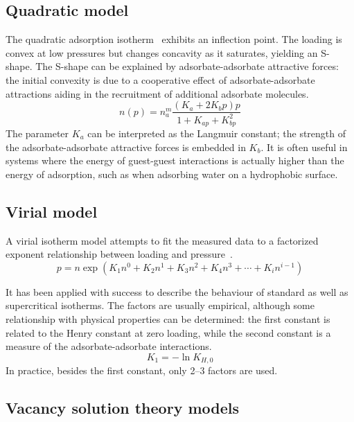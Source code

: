 \subsection{Quadratic model}\label{pyg:models:quadratic}

The quadratic adsorption
isotherm~\cite{hillIntroductionStatisticalThermodynamics1986}
exhibits an inflection point. The loading is convex at low
pressures but changes concavity as it saturates, yielding
an S-shape. The S-shape can be explained by adsorbate-adsorbate
attractive forces: the initial convexity is due to a cooperative
effect of adsorbate-adsorbate attractions aiding in the recruitment
of additional adsorbate molecules.
%
\begin{equation}\label{pyg:eqn:quad}
	n(p) = n_a^m \frac{(K_a + 2 K_b p)p}{1+K_{ap} + K_{bp}^2}
\end{equation}
%
The parameter \(K_a\) can be interpreted as the Langmuir constant;
the strength of the adsorbate-adsorbate attractive forces is
embedded in \(K_b\). It is often useful in systems where the
energy of guest-guest interactions is actually higher than
the energy of adsorption, such as when adsorbing water
on a hydrophobic surface.

\subsection{Virial model}\label{pyg:models:virial}

A virial isotherm model attempts to fit the measured data to a
factorized exponent relationship between loading and
pressure~\cite{myersThermodynamicsAdsorptionPorous2002}.
%
\begin{equation}\label{pyg:eqn:virial}
	p = n \exp{(K_1n^0 + K_2n^1 + K_3n^2 + K_4n^3 + \cdots + K_i
		n^{i-1})}
\end{equation}

It has been applied with success to describe the behaviour of
standard as well as supercritical isotherms. The factors are
usually empirical, although some relationship with physical
properties can be determined:
the first constant is related to the Henry constant at
zero loading, while the second constant is a measure of the
adsorbate-adsorbate interactions.
%
\begin{equation}
	K_1 = -\ln{K_{H,0}}
\end{equation}
%
In practice, besides the first constant, only 2--3 factors are used.

\subsection{Vacancy solution theory models}\label{pyg:models:vst}

